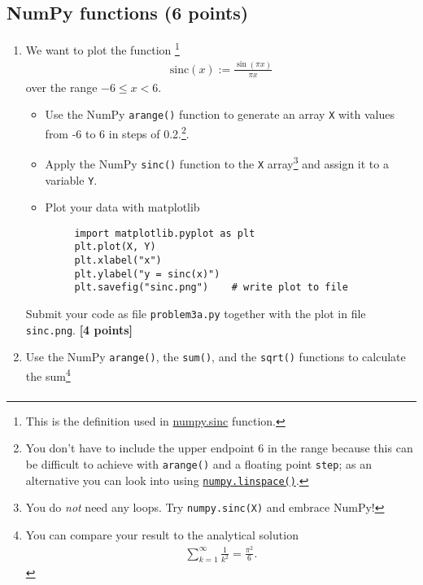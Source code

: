 \documentclass[letterpaper]{scrartcl}
\newcounter{TotalPoints}
\newcommand{\points}[1]{\textbf{[#1 points]}\stepcounter{TotalPoints}}
\newenvironment{enuma}{\begin{enumerate}[label=(\alph*)]}{\end{enumerate}}
\begin{document}
\subsection{NumPy functions (6 points)}
\label{sec:numpyfuncs}

\begin{enuma}
\item We want to plot the function \footnote{This is the definition
    used in
    \href{https://docs.scipy.org/doc/numpy/reference/generated/numpy.sinc.html}{numpy.sinc}
    function.}
  \begin{gather}
    \label{eq:sinc}
    \text{sinc}(x) := \frac{\sin(\pi x)}{\pi x}
  \end{gather}
  over the range $-6 \leq x < 6$.
  \begin{itemize}
  \item Use the NumPy \texttt{arange()} function to generate an array
    \texttt{X} with values from -6 to 6 in steps of 0.2.\footnote{You
      don't have to include the upper endpoint 6 in the range because
      this can be difficult to achieve with \texttt{arange()} and a
      floating point \texttt{step}; as an alternative you can look
      into using
      \href{https://docs.scipy.org/doc/numpy/reference/generated/numpy.linspace.html}{\texttt{numpy.linspace()}}.}.
  \item Apply the NumPy \texttt{sinc()} function to the \texttt{X}
    array\footnote{You do \emph{not} need any loops. Try
      \texttt{numpy.sinc(X)} and embrace NumPy!}
    and assign it to a variable \texttt{Y}.
  \item Plot your data with matplotlib
     \begin{verbatim}
     import matplotlib.pyplot as plt
     plt.plot(X, Y)
     plt.xlabel("x")
     plt.ylabel("y = sinc(x)")
     plt.savefig("sinc.png")    # write plot to file
     \end{verbatim}
  \end{itemize}
  Submit your code as file \texttt{problem3a.py} together with the
  plot in file \texttt{sinc.png}. \points{4}
\item \label{li:zeta2}Use the NumPy \texttt{arange()}, the \texttt{sum()}, and the
  \texttt{sqrt()} functions to calculate the sum\footnote{You can
    compare your result to the analytical solution
    \begin{gather*}
      \sum_{k=1}^{\infty} \frac{1}{k^{2}} = \frac{\pi^{2}}{6}.
    \end{gather*}
  }
  \begin{gather}

\end{gather}
\end{enuma}
\end{document}
